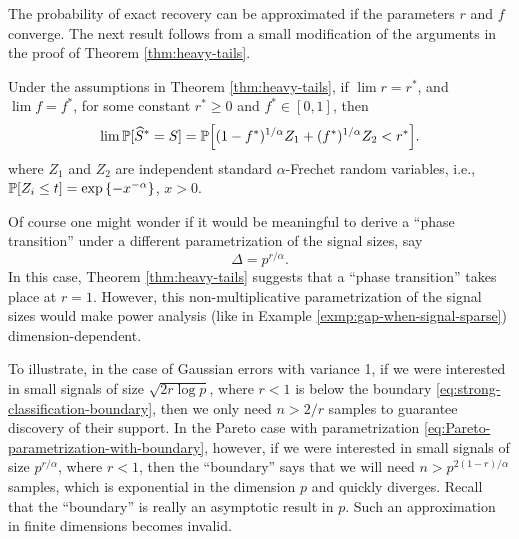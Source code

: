 The probability of exact recovery can be approximated if the parameters $r$ and $f$ converge.
The next result follows from a small modification of the arguments in the proof of Theorem \ref{thm:heavy-tails}.

\begin{corollary}
Under the assumptions in Theorem \ref{thm:heavy-tails}, if 
$\lim r = r^*$, and $\lim f = f^*$, for some constant $r^*\ge0$ and $f^*\in[0,1]$, then 
$$
    \lim \P[\widehat{S}^*=S] 
    = \P\Big[(1-f^*)^{1/\alpha}Z_1 + (f^*)^{1/\alpha}Z_2 < {r^*}\Big].
$$
where $Z_1$ and $Z_2$ are independent standard $\alpha$-Frechet random variables, i.e., $\P[Z_i \le t] = \exp{\{-x^{-\alpha}\}}$, $x>0$.
\end{corollary}

\begin{remark}
Of course one might wonder if it would be meaningful to derive a ``phase transition'' under a different parametrization of the signal sizes, say 
\begin{equation} \label{eq:Pareto-parametrization-with-boundary}
    \Delta = p^{r/\alpha}.
\end{equation}
In this case, Theorem \ref{thm:heavy-tails} suggests that a ``phase transition'' takes place at $r=1$.
However, this non-multiplicative parametrization of the signal sizes would make power analysis (like in Example \ref{exmp:gap-when-signal-sparse}) dimension-dependent. 

To illustrate, in the case of Gaussian errors with variance 1, if we were interested in small signals of size $\sqrt{2r\log{p}}$, where $r<1$ is below the boundary \eqref{eq:strong-classification-boundary}, then we only need $n > 2/r$ samples to guarantee discovery of their support.
In the Pareto case with parametrization \eqref{eq:Pareto-parametrization-with-boundary}, however, if we were interested in small signals of size $p^{r/\alpha}$, where $r<1$, then the ``boundary'' says that we will need $n > p^{2(1-r)/\alpha}$ samples, which is exponential in the dimension $p$ and quickly diverges.
Recall that the ``boundary'' is really an asymptotic result in $p$. 
Such an approximation in finite dimensions becomes invalid.
\end{remark}

